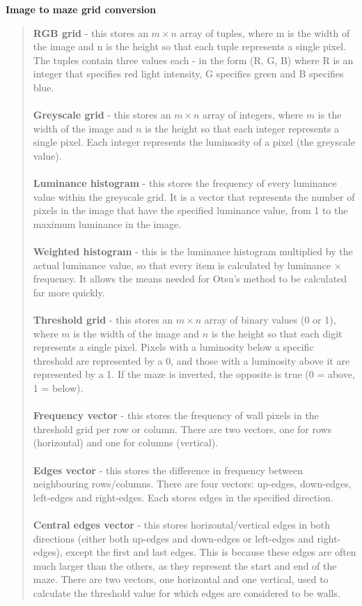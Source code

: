 \documentclass[titlepage]{article}
\begin{document}
\textbf{Image to maze grid conversion}
\begin{quote}
\textbf{RGB grid} - this stores an $m \times n$ array of tuples, where m is the width of the image and n is the height so that each tuple represents a single pixel. The tuples contain three values each - in the form (R, G, B) where R is an integer that specifies red light intensity, G specifies green and B specifies blue.
\\\\
\textbf{Greyscale grid}  - this stores an $m \times n$ array of integers, where $m$ is the width of the image and $n$ is the height so that each integer represents a single pixel. Each integer represents the luminosity of a pixel (the greyscale value).
\\\\
\textbf{Luminance histogram} - this stores the frequency of every luminance value within the greyscale grid. It is a vector that represents the number of pixels in the image that have the specified luminance value, from 1 to the maximum luminance in the image.
\\\\
\textbf{Weighted histogram} - this is the luminance histogram multiplied by the actual luminance value, so that every item is calculated by luminance $\times$ frequency. It allows the means needed for Otsu's method to be calculated far more quickly.
\\\\
\textbf{Threshold grid} - this stores an $m \times n$ array of binary values (0 or 1), where $m$ is the width of the image and $n$ is the height so that each digit represents a single pixel. Pixels with a luminosity below a specific threshold are represented by a 0, and those with a luminosity above it are represented by a 1. If the maze is inverted, the opposite is true (0 = above, 1 = below).
\\\\
\textbf{Frequency vector} - this stores the frequency of wall pixels in the threshold grid per row or column. There are two vectors, one for rows (horizontal) and one for columns (vertical).
\\\\
\textbf{Edges vector} - this stores the difference in frequency between neighbouring rows/columns. There are four vectors: up-edges, down-edges, left-edges and right-edges. Each stores edges in the specified direction.
\\\\
\textbf{Central edges vector} - this stores horizontal/vertical edges in both directions (either both up-edges and down-edges or left-edges and right-edges), except the first and last edges. This is because these edges are often much larger than the others, as they represent the start and end of the maze. There are two vectors, one horizontal and one vertical, used to calculate the threshold value for which edges are considered to be walls.

\end{quote}
\end{document}
